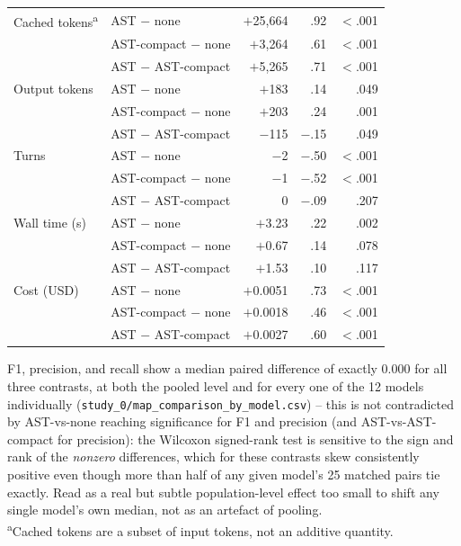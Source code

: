 \begin{table}[htbp]
\begin{tabular}{@{}l l r r r@{}}
Cached tokens\textsuperscript{a} & AST $-$ none          & $+$25{,}664 & .92 & $<$.001 \\
                     & AST-compact $-$ none  & $+$3{,}264  & .61 & $<$.001 \\
                     & AST $-$ AST-compact   & $+$5{,}265  & .71 & $<$.001 \\
\addlinespace
Output tokens        & AST $-$ none          & $+$183 & .14  & .049 \\
                     & AST-compact $-$ none  & $+$203 & .24  & .001 \\
                     & AST $-$ AST-compact   & $-$115 & $-$.15 & .049 \\
\addlinespace
Turns                & AST $-$ none          & $-$2 & $-$.50 & $<$.001 \\
                     & AST-compact $-$ none  & $-$1 & $-$.52 & $<$.001 \\
                     & AST $-$ AST-compact   & 0    & $-$.09 & .207 \\
\addlinespace
Wall time (s)        & AST $-$ none          & $+$3.23 & .22 & .002 \\
                     & AST-compact $-$ none  & $+$0.67 & .14 & .078 \\
                     & AST $-$ AST-compact   & $+$1.53 & .10 & .117 \\
\addlinespace
Cost (USD)           & AST $-$ none          & $+$0.0051 & .73 & $<$.001 \\
                     & AST-compact $-$ none  & $+$0.0018 & .46 & $<$.001 \\
                     & AST $-$ AST-compact   & $+$0.0027 & .60 & $<$.001 \\
\bottomrule
\end{tabular}

\vspace{4pt}
\footnotesize
F1, precision, and recall show a median paired difference of exactly 0.000 for all three contrasts, at both the pooled level and for every one of the 12 models individually (\texttt{study\_0/map\_comparison\_by\_model.csv}) -- this is not contradicted by AST-vs-none reaching significance for F1 and precision (and AST-vs-AST-compact for precision): the Wilcoxon signed-rank test is sensitive to the sign and rank of the \emph{nonzero} differences, which for these contrasts skew consistently positive even though more than half of any given model's 25 matched pairs tie exactly. Read as a real but subtle population-level effect too small to shift any single model's own median, not as an artefact of pooling.\\
\textsuperscript{a}Cached tokens are a subset of input tokens, not an additive quantity.
\end{table}
